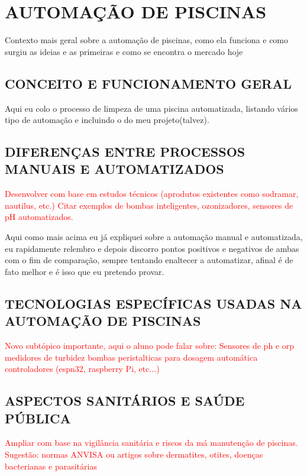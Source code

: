        
\section{AUTOMAÇÃO DE PISCINAS}

    Contexto mais geral sobre a automação de piscinas, como ela funciona e como surgiu as ideias e as primeiras e como se encontra o mercado hoje

    \subsection{CONCEITO E FUNCIONAMENTO GERAL}
        Aqui eu colo o processo de limpeza de uma piscina automatizada, listando vários tipo de automação e incluindo o do meu projeto(talvez).

    \subsection{DIFERENÇAS ENTRE PROCESSOS MANUAIS E AUTOMATIZADOS}

        \textcolor{red}{Desenvolver com base em estudos técnicos (aprodutos existentes como sodramar, nautilus, etc.) Citar exemplos de bombas inteligentes, ozonizadores, sensores de pH automatizados.}
    
        Aqui como mais acima eu já expliquei sobre a automação manual e automatizada, eu rapidamente relembro e depois discorro pontos positivos e negativos de ambas com o fim de comparação, sempre tentando enaltecer a automatizar, afinal é de fato melhor e é isso que eu pretendo provar.
    
    \subsection{TECNOLOGIAS ESPECÍFICAS USADAS NA AUTOMAÇÃO DE PISCINAS}
        \textcolor{red}{Novo subtópico importante, aqui o aluno pode falar sobre: 
        Sensores de ph e orp
        medidores de turbidez
        bombas peristalticas para dosagem automática
        controladores (espn32, raspberry Pi, etc...)}

    \subsection{ASPECTOS SANITÁRIOS E SAÚDE PÚBLICA}
        \textcolor{red}{Ampliar com base na vigilância sanitária e riscos da má manutenção de piscinas. Sugestão: normas ANVISA ou artigos sobre dermatites, otites, doenças bacterianas e parasitárias}


